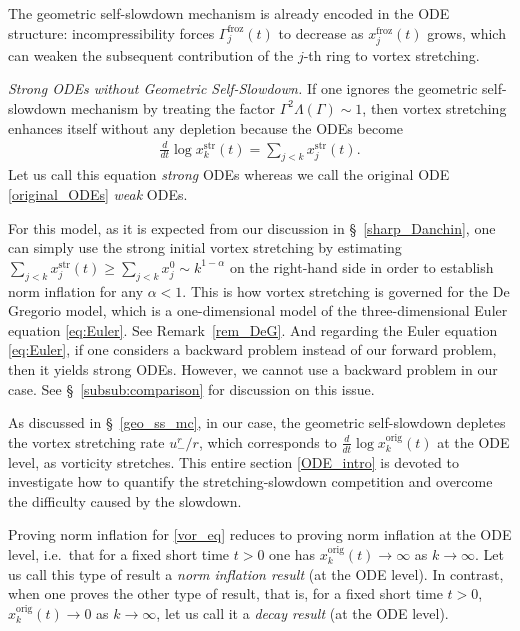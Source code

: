 \documentclass[reqno,11pt]{amsart}
\begin{document}
The geometric self-slowdown mechanism is already encoded in the ODE structure:
incompressibility forces $\Gamma_j^{\mathrm{froz}}(t)$ to decrease as $x_j^{\mathrm{froz}}(t)$ grows, which can
weaken the subsequent contribution of the $j$-th ring to vortex stretching.


\medskip
\noindent \emph{Strong ODEs without Geometric Self-Slowdown.}
If one ignores the geometric self-slowdown mechanism by treating the factor $\Gamma ^2 \Lambda (\Gamma)\sim 1$, then vortex stretching enhances itself without any depletion because
the ODEs become
    \begin{align*}
        \frac{d}{dt} \log x_k^{\mathrm{str}}(t)
        = \sum_{j<k} x_j^{\mathrm{str}}(t).
    \end{align*}
Let us call this equation \emph{strong} ODEs whereas we call the original ODE \eqref{original_ODEs} \emph{weak} ODEs.
    
For this model, as it is expected from our discussion in \S~\ref{sharp_Danchin}, one can simply use the strong initial vortex stretching by estimating $\sum_{j<k}x_j^{\mathrm{str}}(t) \geq \sum_{j<k}x_j^0 \sim k^{1-\alpha}$ on the right-hand side in order to establish norm inflation for any $\alpha<1.$ This is how vortex stretching is governed for the De Gregorio model, which is a one-dimensional model of the three-dimensional  Euler equation \eqref{eq:Euler}. See Remark~\ref{rem_DeG}. And regarding the Euler equation \eqref{eq:Euler}, if one considers a backward problem instead of our forward problem, then it yields strong ODEs. However, we cannot use a backward problem in our case. See \S~\ref{subsub:comparison} for discussion on this issue.

As discussed in \S~\ref{geo_ss_mc}, in our case, the geometric self-slowdown depletes the vortex stretching rate $u^{r}_-/r$, which corresponds to $\frac{d}{dt}\log x_k^{\mathrm{orig}}(t)$ at the ODE level, as vorticity stretches. This entire section \ref{ODE_intro} is devoted to investigate how to quantify the stretching-slowdown competition and overcome the difficulty caused by the slowdown.

Proving norm inflation for \eqref{vor_eq} reduces to proving norm inflation at the ODE
level, i.e.\ that for a fixed short time $t>0$ one has $x_k^{\mathrm{orig}}(t)\to\infty$ as
$k\to\infty$. Let us call this type of result a \emph{norm inflation result} (at the ODE level). In contrast, when one proves the other type of result, that is, for a fixed short time $t>0$, $x_k^{\mathrm{orig}}(t) \to 0$ as $k\to\infty$, let us call it a \emph{decay result} (at the ODE level).
\end{document}

